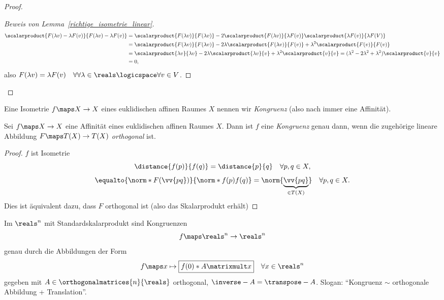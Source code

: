 \begin{proof}
\begin{proof}[Beweis von Lemma~\ref{richtige_isometrie_linear}]
    \begin{align*}
      \scalarproduct{F(\lambda v)-\lambda F(v)}{F(\lambda v)-\lambda F(v)}&=\scalarproduct{F(\lambda v)}{F(\lambda v)}-2\scalarproduct{F(\lambda v)}{\lambda F(v)}\scalarproduct{\lambda F(v)}{\lambda F(V)}\\
      &=\scalarproduct{F(\lambda v)}{F(\lambda v)}-2\lambda \scalarproduct{F(\lambda v)}{F(v)}+\lambda^2\scalarproduct{F(v)}{F(v)}\\
      &=\scalarproduct{\lambda v}{\lambda v}-2\lambda \scalarproduct{\lambda v}{v}+\lambda^2\scalarproduct{v}{v}=(\lambda^2-2\lambda^2+\lambda^2)\scalarproduct{v}{v}\\
      &=0,
    \end{align*}
    also \( F(\lambda v)=\lambda F(v)\quad  \forall \forall \lambda\in\reals\logicspace \forall v\in V \).
  \end{proof}
\end{proof}
\begin{definition*}
  Eine Isometrie \( f\maps X\to X \) eines euklidischen affinen Raumes \( X \) nennen wir \emph{Kongruenz} (also nach  immer eine Affinität).
\end{definition*}
\begin{lemma}
  Sei \( f\maps X\to X \) eine Affinität eines euklidischen affinen Raumes \( X \). Dann ist \( f \) eine \emph{Kongruenz} genau dann, wenn die zugehörige lineare Abbildung \( F\maps T(X)\to T(X) \) \emph{orthogonal} ist.
\end{lemma}
\begin{proof}
  \( f  \) ist Isometrie \gdw
  \begin{equation*}
    \distance{f(p)}{f(q)}=\distance{p}{q}\quad \forall p,q\in X,
  \end{equation*}
  \dh \gdw
  \begin{equation*}
    \equalto{\norm*{F(\vv{pq})}}{\norm*{f(p)f(q)}}=\norm{\underbrace{\vv{pq}}_{\in T(X)}} \quad \forall p,q\in X.
  \end{equation*}
  Dies ist äquivalent dazu, dass \( F \) orthogonal ist (also das Skalarprodukt erhält)
\end{proof}
\begin{bemerkung*}
  Im \( \reals^n \) mit Standardskalarprodukt sind Kongruenzen
  \begin{equation*}
    f\maps \reals^n\to \reals^n
  \end{equation*}
  genau durch die Abbildungen der Form
  \begin{equation*}
    f\maps x\mapsto \boxed{f(0)*A\matrixmult x}\quad \forall x\in \reals^n
  \end{equation*}
  gegeben mit \( A\in \orthogonalmatrices{n}{\reals} \) orthogonal, \dh \( \inverse-{A}=\transpose-{A} \). Slogan: \enquote{Kongruenz \( \sim \) orthogonale Abbildung + Translation}.
\end{bemerkung*}
